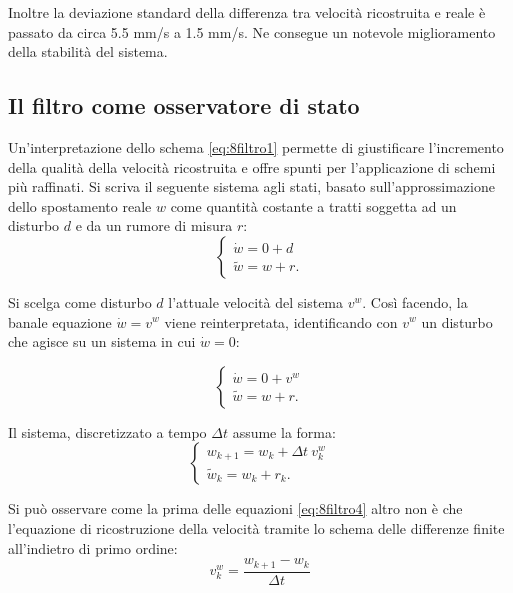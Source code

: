  Inoltre la deviazione standard della differenza tra velocità ricostruita e reale è passato da circa 5.5 mm/s a 1.5 mm/s. 
Ne consegue un notevole miglioramento della stabilità del sistema.

\subsection{Il filtro come osservatore di stato}
Un'interpretazione dello schema \eqref{eq:8filtro1} permette di giustificare l'incremento della qualità della velocità ricostruita e offre spunti per l'applicazione di schemi più raffinati. Si scriva il seguente sistema agli stati, basato sull'approssimazione dello spostamento reale $w$ come quantità costante a tratti soggetta ad un disturbo $d$ e da un rumore di misura $r$:
\begin{equation}
\label{eq:8filtro2}
\left\{
\begin{array}{l}
\dot{w} = 0+d\\
\tilde{w} = w +r.
\end{array}\right.
\end{equation}

Si scelga come disturbo $d$ l'attuale velocità del sistema $v^w$. Così facendo, la banale equazione $\dot{w} = v^w$ viene reinterpretata, identificando con $v^w$ un disturbo che agisce su un sistema in cui $\dot{w}=0$:

\begin{equation}
\label{eq:8filtro3}
\left\{
\begin{array}{l}
\dot{w} = 0+v^w\\
\tilde{w} = w +r.
\end{array}\right.
\end{equation}

Il sistema, discretizzato a tempo $\Delta t$ assume la forma:
\begin{equation}
\label{eq:8filtro4}
\left\{
\begin{array}{l}
w_{k+1} = w_k+\Delta t ~v^w_k\\
\tilde{w}_k = w_k +r_k.
\end{array}\right.
\end{equation}

Si può osservare come la prima delle equazioni \eqref{eq:8filtro4} altro non è che l'equazione di ricostruzione della velocità tramite lo schema delle differenze finite all'indietro di primo ordine:
\begin{equation}
\label{eq:8filtro5}
v^w_k = \frac{w_{k+1}-w_k}{\Delta t}
\end{equation}

